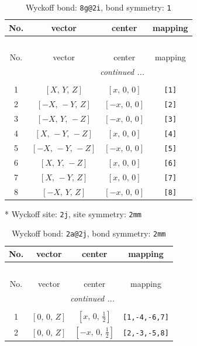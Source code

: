 \documentclass[fleqn,8pt]{jsarticle}
\begin{document}
\renewcommand{\arraystretch}{1.2}
\begin{longtable}{cccc}
\caption{Wyckoff bond: {\tt 8g@2i}, bond symmetry: {\tt 1}}
 \\
 \hline \hline
No. & vector & center & mapping \\ \hline \endfirsthead

\multicolumn{3}{l}{\tablename\ \thetable{}} \\
 \hline \hline
No. & vector & center & mapping \\ \hline \endhead

 \hline \hline
\multicolumn{3}{r}{\footnotesize\it continued ...} \\ \endfoot

 \hline \hline
\multicolumn{3}{r}{} \\ \endlastfoot

1 & $\left[ X,\, Y,\, Z \right]$ & $\left[ x,\, 0,\, 0 \right]$ & {\tt [1]} \\ \hline
2 & $\left[ - X,\, - Y,\, Z \right]$ & $\left[ - x,\, 0,\, 0 \right]$ & {\tt [2]} \\ \hline
3 & $\left[ - X,\, Y,\, - Z \right]$ & $\left[ - x,\, 0,\, 0 \right]$ & {\tt [3]} \\ \hline
4 & $\left[ X,\, - Y,\, - Z \right]$ & $\left[ x,\, 0,\, 0 \right]$ & {\tt [4]} \\ \hline
5 & $\left[ - X,\, - Y,\, - Z \right]$ & $\left[ - x,\, 0,\, 0 \right]$ & {\tt [5]} \\ \hline
6 & $\left[ X,\, Y,\, - Z \right]$ & $\left[ x,\, 0,\, 0 \right]$ & {\tt [6]} \\ \hline
7 & $\left[ X,\, - Y,\, Z \right]$ & $\left[ x,\, 0,\, 0 \right]$ & {\tt [7]} \\ \hline
8 & $\left[ - X,\, Y,\, Z \right]$ & $\left[ - x,\, 0,\, 0 \right]$ & {\tt [8]} \\
\end{longtable}
* Wyckoff site: {\tt 2j}, site symmetry: {\tt 2mm}
\renewcommand{\arraystretch}{1.2}
\begin{longtable}{cccc}
\caption{Wyckoff bond: {\tt 2a@2j}, bond symmetry: {\tt 2mm}}
 \\
 \hline \hline
No. & vector & center & mapping \\ \hline \endfirsthead

\multicolumn{3}{l}{\tablename\ \thetable{}} \\
 \hline \hline
No. & vector & center & mapping \\ \hline \endhead

 \hline \hline
\multicolumn{3}{r}{\footnotesize\it continued ...} \\ \endfoot

 \hline \hline
\multicolumn{3}{r}{} \\ \endlastfoot

1 & $\left[ 0,\, 0,\, Z \right]$ & $\left[ x,\, 0,\, \frac{1}{2} \right]$ & {\tt [1,-4,-6,7]} \\ \hline
2 & $\left[ 0,\, 0,\, Z \right]$ & $\left[ - x,\, 0,\, \frac{1}{2} \right]$ & {\tt [2,-3,-5,8]} \\
\end{longtable}
\end{document}
